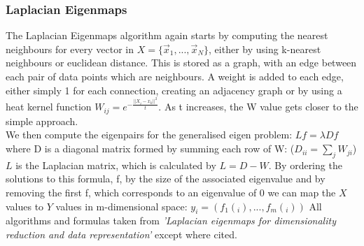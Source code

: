 \documentclass{article}
\begin{document}
\subsubsection{Laplacian Eigenmaps}
The Laplacian Eigenmaps algorithm again starts by computing the nearest neighbours for every vector in $X = \{\vec{x}_1,...,\vec{x}_N\}$, either by using k-nearest neighbours or euclidean distance. This is stored as a graph, with an edge between each pair of data points which are neighbours. A weight is added to each edge, either simply 1 for each connection, creating an adjacency graph or by using a heat kernel function $W_{ij}=e^{-\frac{||X_i-x_k||^2}{t}}$. As t increases, the W value gets closer to the simple approach.\cite{hagueeigen} \\
We then compute the eigenpairs for the generalised eigen problem: $Lf = \lambda Df$ where D is a diagonal matrix formed by summing each row of W: ($D_{ii} = \sum\limits_jW_{ji}$) $L$ is the Laplacian matrix, which is calculated by $L = D-W$. By ordering the solutions to this formula, f, by the size of the associated eigenvalue and by removing the first f, which corresponds to an eigenvalue of 0 we can map the $X$ values to $Y$ values in m-dimensional space: $y_i = (f_1(_i),...,f_m(_i))$
All algorithms and formulas taken from \textit{'Laplacian eigenmaps for dimensionality reduction and data representation'}\cite{belkin2003laplacian} except where cited.
\end{document}
